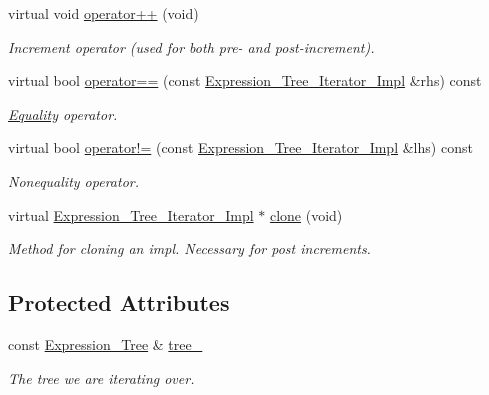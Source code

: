 \begin{DoxyCompactItemize}
virtual void \hyperlink{classMadara_1_1Expression__Tree_1_1Level__Order__Expression__Tree__Iterator__Impl_a56c8cc249b41bff3b9733903e77fa8e3}{operator++} (void)
\begin{DoxyCompactList}\small\item\em Increment operator (used for both pre-\/ and post-\/increment). \item\end{DoxyCompactList}\item 
virtual bool \hyperlink{classMadara_1_1Expression__Tree_1_1Level__Order__Expression__Tree__Iterator__Impl_a708123e4025c43591e4b99c59803a4f3}{operator==} (const \hyperlink{classMadara_1_1Expression__Tree_1_1Expression__Tree__Iterator__Impl}{Expression\_\-Tree\_\-Iterator\_\-Impl} \&rhs) const 
\begin{DoxyCompactList}\small\item\em \hyperlink{classMadara_1_1Expression__Tree_1_1Equality}{Equality} operator. \item\end{DoxyCompactList}\item 
virtual bool \hyperlink{classMadara_1_1Expression__Tree_1_1Level__Order__Expression__Tree__Iterator__Impl_a835faee53063b5ed6018515110525169}{operator!=} (const \hyperlink{classMadara_1_1Expression__Tree_1_1Expression__Tree__Iterator__Impl}{Expression\_\-Tree\_\-Iterator\_\-Impl} \&lhs) const 
\begin{DoxyCompactList}\small\item\em Nonequality operator. \item\end{DoxyCompactList}\item 
virtual \hyperlink{classMadara_1_1Expression__Tree_1_1Expression__Tree__Iterator__Impl}{Expression\_\-Tree\_\-Iterator\_\-Impl} $\ast$ \hyperlink{classMadara_1_1Expression__Tree_1_1Level__Order__Expression__Tree__Iterator__Impl_a404b1f5dae7f4349899f448bf6250b32}{clone} (void)
\begin{DoxyCompactList}\small\item\em Method for cloning an impl. Necessary for post increments. \item\end{DoxyCompactList}\end{DoxyCompactItemize}
\subsection*{Protected Attributes}
\begin{DoxyCompactItemize}
\item 
const \hyperlink{classMadara_1_1Expression__Tree_1_1Expression__Tree}{Expression\_\-Tree} \& \hyperlink{classMadara_1_1Expression__Tree_1_1Expression__Tree__Iterator__Impl_a4b369e3fcfc62405321ece1d46719f93}{tree\_\-}
\begin{DoxyCompactList}\small\item\em The tree we are iterating over. \item\end{DoxyCompactList}\end{DoxyCompactItemize}

